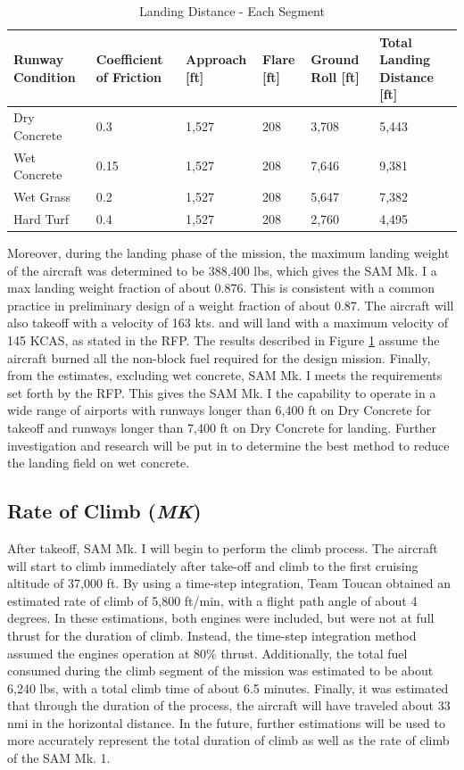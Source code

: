\begin{table}[!h]
    \centering
    \caption{Landing Distance - Each Segment}
    \begin{tabular}{|p{1.1in}|p{.8in}|p{.8in}|p{.6in}|p{.6in}|p{.9in}|}\toprule 
    \textbf{Runway Condition} & \textbf{Coefficient of Friction \cite{raymer}} & \textbf{Approach [ft]} & \textbf{Flare [ft]} & \textbf{Ground Roll [ft]} & \textbf{Total Landing Distance [ft]} \\ \hline 
    Dry Concrete & 0.3 & 1,527 & 208 & 3,708 & 5,443  \\ \hline
    Wet Concrete & 0.15 & 1,527 & 208 & 7,646 & 9,381\\ \hline
    Wet Grass & 0.2 & 1,527 & 208 & 5,647 & 7,382\\ \hline
    Hard Turf & 0.4 & 1,527 & 208 & 2,760 & 4,495 \\ \bottomrule
    \end{tabular}
    \label{tab:land}
\end{table}

Moreover, during the landing phase of the mission, the maximum landing weight of the aircraft was determined to be 388,400 lbs, which gives the SAM Mk. I a max landing weight fraction of about 0.876. This is consistent with a common practice in preliminary design of a weight fraction of about 0.87. The aircraft will also takeoff with a velocity of 163 kts. and will land with a maximum velocity of 145 KCAS, as stated in the RFP. The results described in Figure \ref{tab:land} assume the aircraft burned all the non-block fuel required for the design mission. Finally, from the estimates, excluding wet concrete, SAM Mk. I meets the requirements set forth by the RFP. This gives the SAM Mk. I the capability to operate in a wide range of airports with runways longer than 6,400 ft on Dry Concrete for takeoff and runways longer than 7,400 ft on Dry Concrete for landing. Further investigation and research will be put in to determine the best method to reduce the landing field on wet concrete. 

\subsection{Rate of Climb (\textit{MK})}
After takeoff, SAM Mk. I will begin to perform the climb process. The aircraft will start to climb immediately after take-off and climb to the first cruising altitude of 37,000 ft. By using a time-step integration, Team Toucan obtained an estimated rate of climb of 5,800 ft/min, with a flight path angle of about 4 degrees. In these estimations, both engines were included, but were not at full thrust for the duration of climb. Instead, the time-step integration method assumed the engines operation at 80\% thrust. Additionally, the total fuel consumed during the climb segment of the mission was estimated to be about 6,240 lbs, with a total climb time of about 6.5 minutes. Finally, it was estimated that through the duration of the process, the aircraft will have traveled about 33 nmi in the horizontal distance. In the future, further estimations will be used to more accurately represent the total duration of climb as well as the rate of climb of the SAM Mk. 1. 

